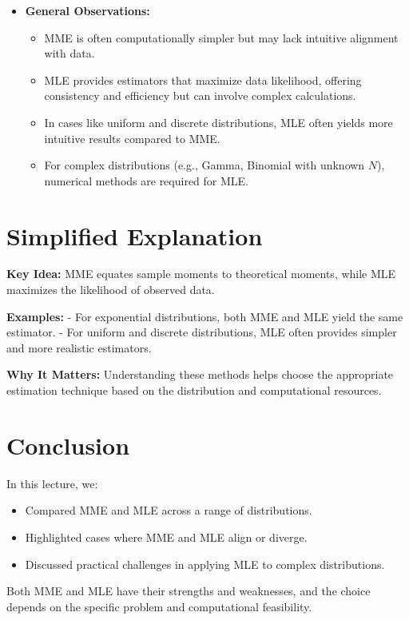 \documentclass{article}
\begin{document}
\begin{itemize}
  \item \textbf{General Observations:}
    \begin{itemize}
      \item MME is often computationally simpler but may lack intuitive alignment with data.
      \item MLE provides estimators that maximize data likelihood, offering consistency and efficiency but can involve complex calculations.
      \item In cases like uniform and discrete distributions, MLE often yields more intuitive results compared to MME.
      \item For complex distributions (e.g., Gamma, Binomial with unknown $N$), numerical methods are required for MLE.
    \end{itemize}
\end{itemize}

\section*{Simplified Explanation}

\textbf{Key Idea:}
MME equates sample moments to theoretical moments, while MLE maximizes the likelihood of observed data.

\textbf{Examples:}
- For exponential distributions, both MME and MLE yield the same estimator.
- For uniform and discrete distributions, MLE often provides simpler and more realistic estimators.

\textbf{Why It Matters:}
Understanding these methods helps choose the appropriate estimation technique based on the distribution and computational resources.

\section*{Conclusion}

In this lecture, we:
\begin{itemize}
  \item Compared MME and MLE across a range of distributions.
  \item Highlighted cases where MME and MLE align or diverge.
  \item Discussed practical challenges in applying MLE to complex distributions.
\end{itemize}

Both MME and MLE have their strengths and weaknesses, and the choice depends on the specific problem and computational feasibility.
\end{document}
